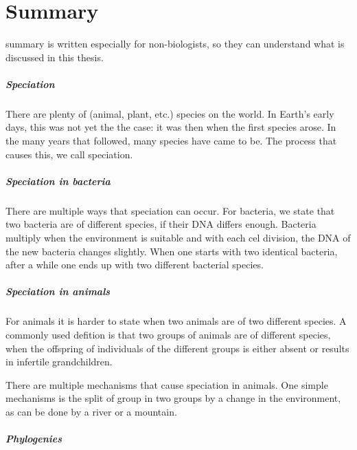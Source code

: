 \chapter*{Summary}

\noindent 
{} summary is written especially for
non-biologists, so they can understand what is
discussed in this thesis.

\paragraph{Speciation}

There are plenty of (animal, plant, etc.) species on the world.
In Earth's early days, this was not yet the the case:
it was then when the first species arose.
In the many years that followed, many species have came to be.
The process that causes this, we call speciation.

\paragraph{Speciation in bacteria}

There are multiple ways that speciation can occur.
For bacteria, we state that two bacteria are of different species,
if their DNA differs enough. Bacteria multiply when the 
environment is suitable and with each cel division, the DNA
of the new bacteria changes slightly. 
When one starts with two identical bacteria, after a while one
ends up with two different bacterial species.

\paragraph{Speciation in animals}

For animals it is harder to state when two animals are of two 
different species. A commonly used defition is that two groups
of animals are of different species, when the offspring 
of individuals of the different groups is either absent 
or results in infertile grandchildren.

There are multiple mechanisms that cause speciation in animals.
One simple mechanisms is the split of group in two groups
by a change in the environment, as can be done by a river
or a mountain.

\paragraph{Phylogenies}

